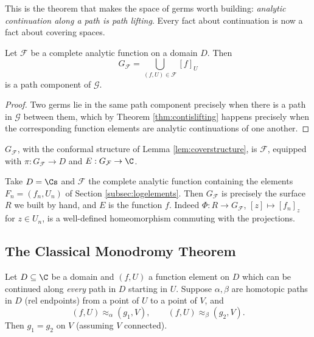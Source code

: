 This is the theorem that makes the space of germs worth building: \emph{analytic
continuation along a path is path lifting}. Every fact about continuation is now a fact
about covering spaces.

\begin{corollary}\label{cor:completefn}
	Let $\mathcal{F}$ be a complete analytic function on a domain $D$. Then
	$$
	G_{\mathcal{F}} = \bigcup_{(f,U) \in \mathcal{F}} [f]_U
	$$
	is a path component of $\mathcal{G}$.
\end{corollary}

\begin{proof}
	Two germs lie in the same path component precisely when there is a path in
	$\mathcal{G}$ between them, which by Theorem \ref{thm:contislifting} happens precisely
	when the corresponding function elements are analytic continuations of one another.
\end{proof}

\begin{definition}
	$G_{\mathcal{F}}$, with the conformal structure of Lemma \ref{lem:coverstructure}, is
	 $\mathcal{F}$, equipped
	with $\pi : G_\mathcal{F} \to D$ and $E : G_\mathcal{F} \to \C$.
\end{definition}

\begin{example}
	Take $D = \Cs$ and $\mathcal{F}$ the complete analytic function containing the elements
	$F_n = (f_n, U_n)$ of Section \ref{subsec:logelements}. Then $G_\mathcal{F}$ is
	precisely the surface $R$ we built by hand, and $E$ is the function $f$. Indeed
	$\Phi : R \to G_\mathcal{F}$, $[z] \mapsto [f_n]_z$ for $z \in U_n$, is a well-defined
	homeomorphism commuting with the projections.
\end{example}

\subsection{The Classical Monodromy Theorem}

\begin{theorem}\label{thm:classicalmonodromy}
	Let $D \subseteq \C$ be a domain and $(f, U)$ a function element on $D$ which can be
	continued along \emph{every} path in $D$ starting in $U$. Suppose $\alpha, \beta$ are
	homotopic paths in $D$ (rel endpoints) from a point of $U$ to a point of $V$, and
	$$
	(f, U) \approx_\alpha (g_1, V), \qquad (f,U)\approx_\beta (g_2, V).
	$$
	Then $g_1 = g_2$ on $V$ (assuming $V$ connected).
\end{theorem}

